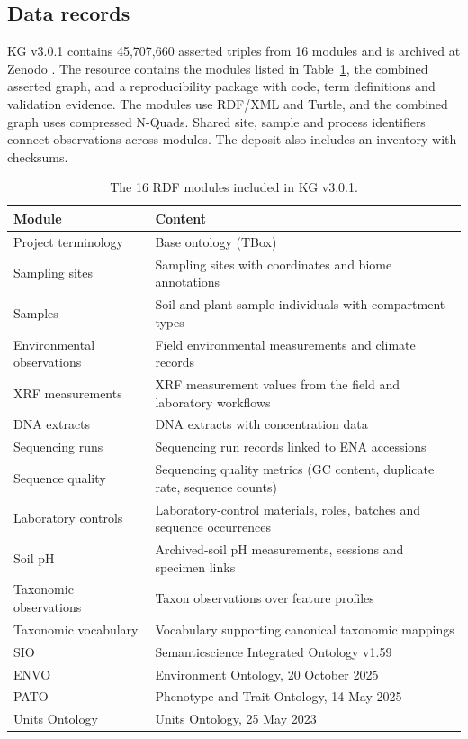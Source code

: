 \begin{revision}
\section{Data records}\label{records}

KG v3.0.1 contains 45,707,660 asserted triples from 16
modules and is archived at Zenodo \cite{rubalkhali_kg301}. The resource contains the modules listed in Table~\ref{tab:modules},
the combined asserted graph, and a reproducibility package with code,
term definitions and validation evidence. The modules use RDF/XML and
Turtle, and the combined graph uses compressed N-Quads. Shared site, sample and
process identifiers connect observations across modules. The deposit also includes an inventory with checksums.

\begin{table}[h]
\centering
\caption{The 16 RDF modules included in KG v3.0.1.}
\label{tab:modules}
\small
\begin{tabular}{p{} p{}}
\toprule
\textbf{Module} & \textbf{Content} \\
\midrule
Project terminology & Base ontology (TBox) \\
Sampling sites & Sampling sites with coordinates and biome annotations \\
Samples & Soil and plant sample individuals with compartment types \\
Environmental observations & Field environmental measurements and climate records \\
XRF measurements & XRF measurement values from the field and laboratory workflows \\
DNA extracts & DNA extracts with concentration data \\
Sequencing runs & Sequencing run records linked to ENA accessions \\
Sequence quality & Sequencing quality metrics (GC content, duplicate rate, sequence counts) \\
Laboratory controls & Laboratory-control materials, roles, batches and sequence occurrences \\
Soil pH & Archived-soil pH measurements, sessions and specimen links \\
Taxonomic observations & Taxon observations over feature profiles \\
Taxonomic vocabulary & Vocabulary supporting canonical taxonomic mappings \\
SIO & Semanticscience Integrated Ontology v1.59 \\
ENVO & Environment Ontology, 20 October 2025 \\
PATO & Phenotype and Trait Ontology, 14 May 2025 \\
Units Ontology & Units Ontology, 25 May 2023 \\
\bottomrule
\end{tabular}
\end{table}


\end{revision}
